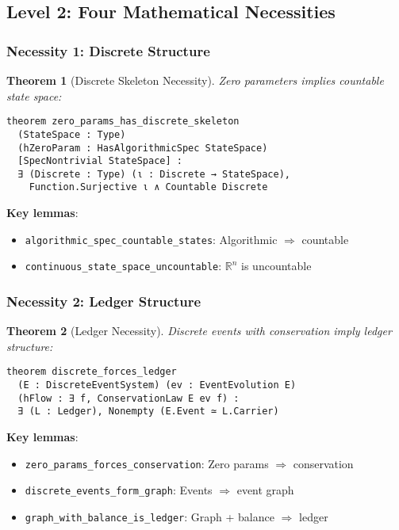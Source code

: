 \documentclass[11pt]{article}
\newtheorem{theorem}{Theorem}[section]
\theoremstyle{definition}
\theoremstyle{remark}
\begin{document}
\subsection{Level 2: Four Mathematical Necessities}

\subsubsection{Necessity 1: Discrete Structure}

\begin{theorem}[Discrete Skeleton Necessity]
\label{thm:discrete-necessity}
Zero parameters implies countable state space:
\begin{lstlisting}[language=lean]
theorem zero_params_has_discrete_skeleton
  (StateSpace : Type)
  (hZeroParam : HasAlgorithmicSpec StateSpace)
  [SpecNontrivial StateSpace] :
  ∃ (Discrete : Type) (ι : Discrete → StateSpace),
    Function.Surjective ι ∧ Countable Discrete
\end{lstlisting}
\end{theorem}

\textbf{Key lemmas}:
\begin{itemize}
\item \texttt{algorithmic\_spec\_countable\_states}: Algorithmic $\Rightarrow$ countable
\item \texttt{continuous\_state\_space\_uncountable}: $\mathbb{R}^n$ is uncountable
\end{itemize}

\subsubsection{Necessity 2: Ledger Structure}

\begin{theorem}[Ledger Necessity]
\label{thm:ledger-necessity}
Discrete events with conservation imply ledger structure:
\begin{lstlisting}[language=lean]
theorem discrete_forces_ledger
  (E : DiscreteEventSystem) (ev : EventEvolution E)
  (hFlow : ∃ f, ConservationLaw E ev f) :
  ∃ (L : Ledger), Nonempty (E.Event ≃ L.Carrier)
\end{lstlisting}
\end{theorem}

\textbf{Key lemmas}:
\begin{itemize}
\item \texttt{zero\_params\_forces\_conservation}: Zero params $\Rightarrow$ conservation
\item \texttt{discrete\_events\_form\_graph}: Events $\Rightarrow$ event graph
\item \texttt{graph\_with\_balance\_is\_ledger}: Graph + balance $\Rightarrow$ ledger
\end{itemize}
\end{document}
